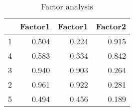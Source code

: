 \begin{table}[ht]
\centering
\begin{tabular}{rrrr}
  \toprule
 & Factor1 & Factor1 & Factor2 \\ 
  \midrule
1 & 0.504 & 0.224 & 0.915 \\ 
  4 & 0.583 & 0.334 & 0.842 \\ 
  3 & 0.940 & 0.903 & 0.264 \\ 
  2 & 0.961 & 0.922 & 0.281 \\ 
  5 & 0.494 & 0.456 & 0.189 \\ 
   \bottomrule
\end{tabular}
\caption{Factor analysis} 
\label{tab:fa2}
\end{table}
